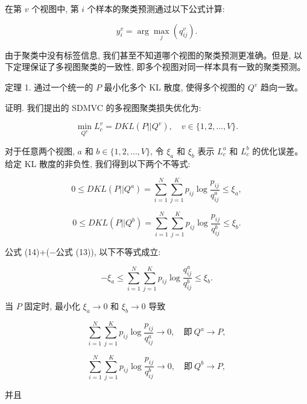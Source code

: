 \documentclass{article}
\begin{document}
在第 $v$ 个视图中, 第 $i$ 个样本的聚类预测通过以下公式计算:

\begin{equation}
    y^v_i = \arg \max_j (q^v_{ij}).
\end{equation}

由于聚类中没有标签信息, 我们甚至不知道哪个视图的聚类预测更准确。但是, 以下定理保证了多视图聚类的一致性, 即多个视图对同一样本具有一致的聚类预测。

定理 1. 通过一个统一的 $P$ 最小化多个 KL 散度, 使得多个视图的 $Q^v$ 趋向一致。

证明. 我们提出的 SDMVC 的多视图聚类损失优化为:

\begin{equation}
    \min_{Q^v} L^v_c = DKL(P || Q^v), \quad v \in \{1, 2, \ldots, V\}.
\end{equation}

对于任意两个视图, $a$ 和 $b \in \{1, 2, \ldots, V\}$, 令 $\xi_a$ 和 $\xi_b$ 表示 $L^a_c$ 和 $L^b_c$ 的优化误差。给定 KL 散度的非负性, 我们得到以下两个不等式:

\begin{equation}
    0 \leq DKL(P || Q^a) = \sum_{i=1}^{N} \sum_{j=1}^{K} p_{ij} \log \frac{p_{ij}}{q^a_{ij}} \leq \xi_a,
\end{equation}

\begin{equation}
    0 \leq DKL(P || Q^b) = \sum_{i=1}^{N} \sum_{j=1}^{K} p_{ij} \log \frac{p_{ij}}{q^b_{ij}} \leq \xi_b.
\end{equation}

公式 (14)+(−公式 (13)), 以下不等式成立:

\begin{equation}
    -\xi_a \leq \sum_{i=1}^{N} \sum_{j=1}^{K} p_{ij} \log \frac{q^a_{ij}}{q^b_{ij}} \leq \xi_b.
\end{equation}

当 $P$ 固定时, 最小化 $\xi_a \to 0$ 和 $\xi_b \to 0$ 导致

\begin{equation}
    \sum_{i=1}^{N} \sum_{j=1}^{K} p_{ij} \log \frac{p_{ij}}{q^a_{ij}} \to 0, \quad 即 \ Q^a \to P,
\end{equation}

\begin{equation}
    \sum_{i=1}^{N} \sum_{j=1}^{K} p_{ij} \log \frac{p_{ij}}{q^b_{ij}} \to 0, \quad 即 \ Q^b \to P,
\end{equation}

并且
\end{document}
